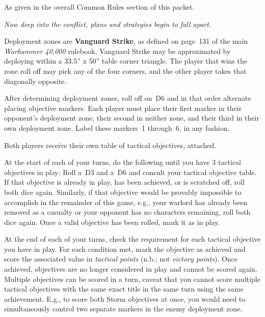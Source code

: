 \documentclass{40k}
\newcommand{\tertiaries}{\missionsubheading{Tertiary Objectives.}

As given in the overall Common Rules section of this packet.}
\begin{document}
\tertiaries


\clearpage
{}

\centerline{\emph{Now deep into the conflict, plans and strategies
    begin to fall apart.}}


Deployment zones are \textbf{Vanguard Strike}, as defined on page~131
of the main \emph{Warhammer 40,000} rulebook.  Vanguard Strike may be
approximated by deploying within a 33.5'' x 50'' table corner
triangle.  The player that wins the zone roll off may pick any of the
four corners, and the other player takes that diagonally opposite.

\bigskip%
After determining deployment zones, roll off on~D6 and in that order
alternate placing objective markers.  Each player must place their
first marker in their opponent's deployment zone, their second in
neither zone, and their third in their own deployment zone.  Label
these markers~1 through~6, in any fashion.

\bigskip%
Both players receive their own table of tactical objectives, attached.



At the start of each of your turns, do the following until you have 3
tactical objectives in play: Roll a~D3 and a~D6 and consult your
tactical objective table.  If that objective is already in play, has
been achieved, or is scratched off, roll both dice again.  Similarly,
if that objective would be provably impossible to accomplish in the
remainder of this game, e.g., your warlord has already been removed as
a casualty or your opponent has no characters remaining, roll both
dice again.  Once a valid objective has been rolled, mark it as in
play.

\smallskip%
At the end of each of your turns, check the requirement for each
tactical objective you have in play.  For each condition met, mark the
objective as achieved and score the associated value in \emph{tactical
  points} (n.b.: not \emph{victory points}).  Once achieved,
objectives are no longer considered in play and cannot be scored
again.  Multiple objectives can be scored in a turn, caveat that you
cannot score multiple tactical objectives with the same exact title in
the same turn using the same achievement.  E.g., to score both Storm
objectives at once, you would need to simultaneously control two
separate markers in the enemy deployment zone.
\end{document}
